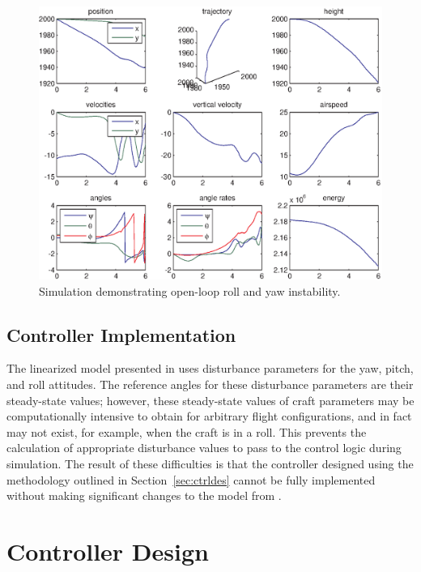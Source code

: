 \documentclass{sydeStyle}
\begin{document}
\begin{figure}
    \begin{center}
        \includegraphics[width=0.8\columnwidth]{figs/rollunstable}
    \end{center}
    \caption{Simulation demonstrating open-loop roll and yaw instability.}
    \label{fig:rollinstability}
\end{figure}

\subsection{Controller Implementation}
\label{sec:ctrlimpl}
The linearized model presented in \cite{spottiswoode} uses disturbance
parameters for the yaw, pitch, and roll attitudes.  The reference angles for
these disturbance parameters are their steady-state values; however, these
steady-state values of craft parameters may be computationally
intensive to obtain for arbitrary flight configurations, and in fact may not
exist, for example, when the craft is in a roll.
This prevents the calculation of appropriate disturbance values to
pass to the control logic during simulation.  The result of these difficulties
is that the controller designed using the methodology outlined in
Section~\ref{sec:ctrldes} cannot be fully implemented without making significant
changes to the model from \cite{spottiswoode}.

\section{Controller Design}

\end{document}
